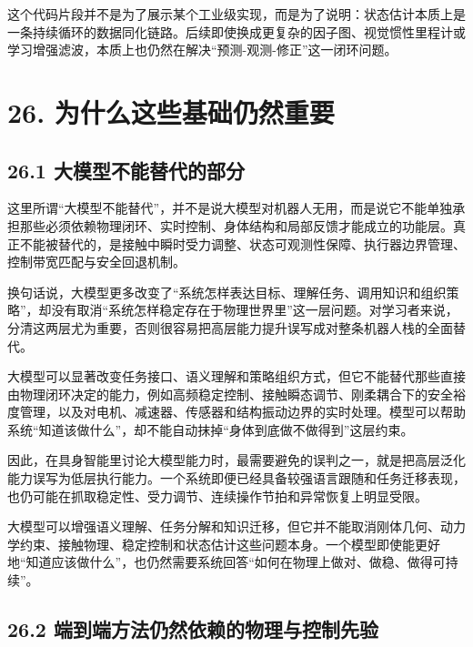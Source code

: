 这个代码片段并不是为了展示某个工业级实现，而是为了说明：状态估计本质上是一条持续循环的数据同化链路。后续即使换成更复杂的因子图、视觉惯性里程计或学习增强滤波，本质上也仍然在解决“预测-观测-修正”这一闭环问题。

\section*{26. 为什么这些基础仍然重要}

\subsection*{26.1 大模型不能替代的部分}


这里所谓“大模型不能替代”，并不是说大模型对机器人无用，而是说它不能单独承担那些必须依赖物理闭环、实时控制、身体结构和局部反馈才能成立的功能层。真正不能被替代的，是接触中瞬时受力调整、状态可观测性保障、执行器边界管理、控制带宽匹配与安全回退机制。

换句话说，大模型更多改变了“系统怎样表达目标、理解任务、调用知识和组织策略”，却没有取消“系统怎样稳定存在于物理世界里”这一层问题。对学习者来说，分清这两层尤为重要，否则很容易把高层能力提升误写成对整条机器人栈的全面替代。

大模型可以显著改变任务接口、语义理解和策略组织方式，但它不能替代那些直接由物理闭环决定的能力，例如高频稳定控制、接触瞬态调节、刚柔耦合下的安全裕度管理，以及对电机、减速器、传感器和结构振动边界的实时处理。模型可以帮助系统“知道该做什么”，却不能自动抹掉“身体到底做不做得到”这层约束。

因此，在具身智能里讨论大模型能力时，最需要避免的误判之一，就是把高层泛化能力误写为低层执行能力。一个系统即便已经具备较强语言跟随和任务迁移表现，也仍可能在抓取稳定性、受力调节、连续操作节拍和异常恢复上明显受限。

大模型可以增强语义理解、任务分解和知识迁移，但它并不能取消刚体几何、动力学约束、接触物理、稳定控制和状态估计这些问题本身。一个模型即使能更好地“知道应该做什么”，也仍然需要系统回答“如何在物理上做对、做稳、做得可持续”。

\subsection*{26.2 端到端方法仍然依赖的物理与控制先验}


